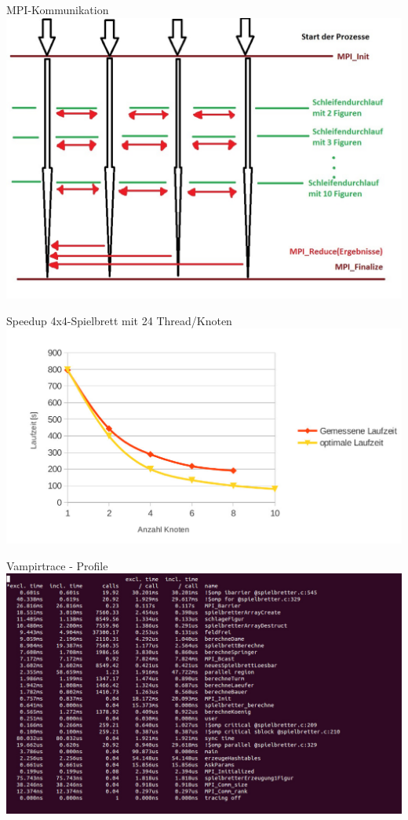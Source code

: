 \documentclass{beamer}
\begin{document}
\begin{frame}{MPI-Kommunikation}
\includegraphics[scale=0.3]{MPI_Kommunikation}
\end{frame}

\begin{frame}{Speedup 4x4-Spielbrett mit 24 Thread/Knoten}
\includegraphics[scale=0.3]{speedup}
\end{frame}

\begin{frame}{Vampirtrace - Profile}
\includegraphics[scale=0.3]{vampirtrace-prof}
\end{frame}



%

%
\end{document}
